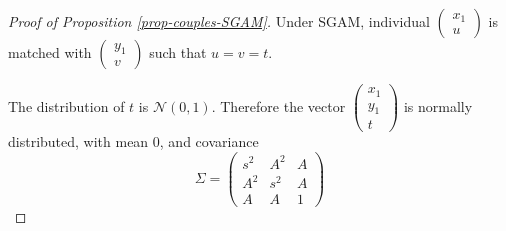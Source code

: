 \documentclass[
]{article}
\theoremstyle{definition}
\theoremstyle{definition}
\theoremstyle{definition}
\theoremstyle{definition}
\theoremstyle{remark}
\begin{document}
\begin{proof}[Proof of Proposition \ref{prop-couples-SGAM}]
Under SGAM, individual $\left( 
\begin{array}{c}
x_{1} \\ 
u
\end{array} 
\right)$ is matched with $\left( 
\begin{array}{c}
y_{1} \\ 
v%
\end{array}%
\right)$ such that $u = v = t$.

The distribution of $t$ is 
$\mathcal{N}\left( 0,1\right)$. Therefore the vector $\left( 
\begin{array}{c}
x_{1} \\ 
y_{1} \\ 
t%
\end{array}%
\right)$ is normally distributed, with mean 0, and covariance
\[
\Sigma =\left( 
\begin{array}{ccc}
s^{2} & A^{2} & A \\ 
A^{2} & s^{2} & A \\ 
A & A & 1
\end{array}%
\right) \allowbreak 
\]


\end{proof}
\end{document}
